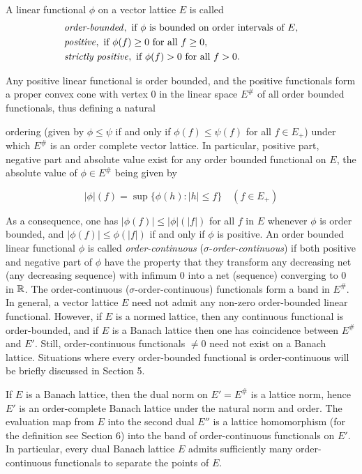 A linear functional $ \phi $ on a vector lattice $ E $ is called
\begin{align*}
&\text{\emph{order-bounded}}, \text{ if } \phi \text{ is bounded on order intervals of } E, \\
&\text{\emph{positive}}, \text{ if } \phi(f) \geq 0 \text{ for all } f \geq 0, \\
&\text{\emph{strictly positive}}, \text{ if } \phi(f) > 0 \text{ for all } f > 0.
\end{align*}

Any positive linear functional is order bounded, and the positive functionals form a proper convex cone with vertex $ 0 $ in the linear space $ E^{\#} $ of all order bounded functionals, thus defining a natural



\pagebreak

ordering (given by $ \phi \leq \psi $ if and only if $ \phi(f) \leq \psi(f) $ for all $ f \in E_{+} $) under which $ E^{\#} $ is an order complete vector lattice.
In particular, positive part, negative part and absolute value exist for any order bounded functional on $ E $, the absolute value of $ \phi \in E^{\#} $ being given by

\[
|\phi|(f) = \sup\{\phi(h) : |h| \leq f\} \quad (f \in E_{+})
\]

As a consequence, one has $ |\phi(f)| \leq |\phi|(|f|) $ for all $ f $ in $ E $ whenever $ \phi $ is order bounded, and $ |\phi(f)| \leq \phi(|f|) $ if and only if $ \phi $ is positive.
An order bounded linear functional $ \phi $ is called \emph{order-continuous} ($ \sigma $-\emph{order-continuous}) if both positive and negative part of $ \phi $ have the property that they transform any decreasing net (any decreasing sequence) with infimum $ 0 $ into a net (sequence) converging to $ 0 $ in $ \mathbb{R} $.
The order-continuous ($ \sigma $-order-continuous) functionals form a band in $ E^{\#} $.
In general, a vector lattice $ E $ need not admit any non-zero order-bounded linear functional.
However, if $ E $ is a normed lattice, then any continuous functional is order-bounded, and if $ E $ is a Banach lattice then one has coincidence between $ E^{\#} $ and $ E' $.
Still, order-continuous functionals $ \neq 0 $ need not exist on a Banach lattice.
Situations where every order-bounded functional is order-continuous will be briefly discussed in Section 5.

If $ E $ is a Banach lattice, then the dual norm on $ E' = E^{\#} $ is a lattice norm, hence $ E' $ is an order-complete Banach lattice under the natural norm and order.
The evaluation map from $ E $ into the second dual $ E'' $ is a lattice homomorphism (for the definition see Section 6) into the band of order-continuous functionals on $ E' $.
In particular, every dual Banach lattice $ E $ admits sufficiently many order-continuous functionals to separate the points of $ E $.

